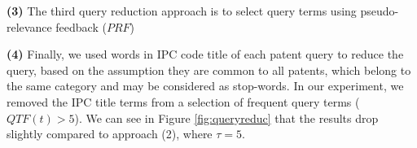 \vspace*{0.5mm}
\noindent \textbf{(3)} The third query reduction approach is to select query terms using pseudo-relevance feedback ($\mathit{PRF}$)

\vspace*{0.5mm}
\noindent \textbf{(4)} Finally, we used words in IPC code title of each patent query to reduce the query, based on the assumption they are common to all patents, which belong to the same category and may be considered as stop-words. In our experiment, we removed the IPC title terms from a selection of frequent query terms ($QTF(t)>5$). We can see in Figure \ref{fig:queryreduc} that the results drop slightly compared to approach (2), where $\tau=5$.
%
%
%


